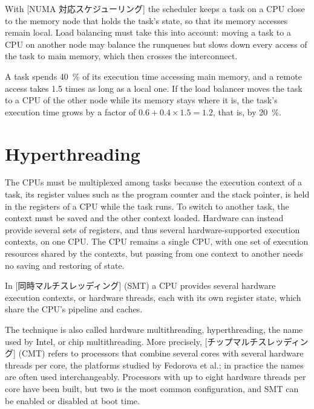 \documentclass[../main.tex]{subfiles}
\begin{document}
With [NUMA 対応スケジューリング] the scheduler
keeps a task on a CPU close to the memory node that holds the task's state,
so that its memory accesses remain local.  Load balancing must take this into account: moving a
task to a CPU on another node may balance the runqueues but slows down
every access of the task to main memory, which then crosses the
interconnect.

\begin{example}
  A task spends \SI{40}{\percent} of its execution time accessing main
  memory, and
  a remote access takes 1.5 times as long as a local one.  If the load
  balancer moves the task to a CPU of the other node while its memory stays
  where it is, the task's execution time grows by a factor of
  $0.6 + 0.4 \times 1.5 = 1.2$, that is, by \SI{20}{\percent}.
\end{example}

\section{Hyperthreading}
\label{sec:l07-smt}

The CPUs must be multiplexed among tasks because the execution context of a
task, its register values such as the program counter and the stack
pointer, is held in the registers of a CPU while the task
runs.  To switch to another task, the context must be
saved and the other context loaded.  Hardware can instead provide several
sets of registers, and thus several hardware-supported execution contexts,
on one CPU.  The CPU remains a single CPU, with one set of execution
resources shared by the contexts, but passing from one context to another
needs no saving and restoring of state.

\begin{definition}
  In [同時マルチスレッディング]%
   (SMT) a CPU
  provides several hardware execution contexts, or hardware threads, each
  with its own register state, which share the CPU's pipeline and caches.
\end{definition}

The technique is also called hardware multithreading, hyperthreading, the
name used by Intel, or chip multithreading.  More precisely,
[チップマルチスレッディング]%
 (CMT) refers to processors that combine
several cores with several hardware threads per core, the platforms studied
by Fedorova et al.; in practice the names are often used interchangeably.  Processors
with up to eight hardware threads per core have been built, but two is the
most common configuration, and SMT can be enabled or disabled at boot
time.
\end{document}
